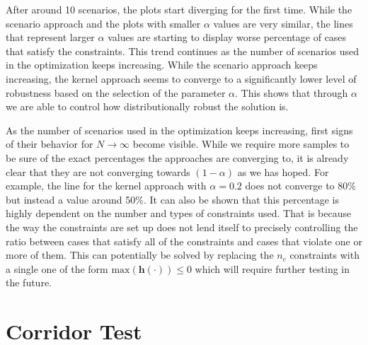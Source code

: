 After around 10 scenarios, the plots start diverging for the first time. While the scenario approach and the plots with smaller $\alpha$ values are very similar, the lines that represent larger $\alpha$ values are starting to display worse percentage of cases that satisfy the constraints. This trend continues as the number of scenarios used in the optimization keeps increasing. While the scenario approach keeps increasing, the kernel approach seems to converge to a significantly lower level of robustness based on the selection of the parameter $\alpha$. This shows that through $\alpha$ we are able to control how distributionally robust the solution is.

As the number of scenarios used in the optimization keeps increasing, first signs of their behavior for $N \to \infty$ become visible. While we require more samples to be sure of the exact percentages the approaches are converging to, it is already clear that they are not converging towards $(1 - \alpha)$ as we has hoped. For example, the line for the kernel approach with $\alpha = 0.2$ does not converge to 80\% but instead a value around 50\%. It can also be shown that this percentage is highly dependent on the number and types of constraints used. That is because the way the constraints are set up does not lend itself to precisely controlling the ratio between cases that satisfy all of the constraints and cases that violate one or more of them. This can potentially be solved by replacing the $n_c$ constraints with a single one of the form $\text{max}(\boldsymbol{h}(\cdot)) \leq 0$ which will require further testing in the future.
 
\section{Corridor Test}


